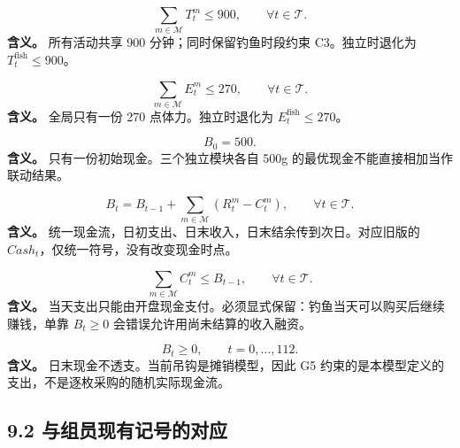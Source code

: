 \documentclass[11pt,a4paper]{article}
\begin{document}
\begin{samepage}
\[
\sum_{m\in\mathcal M}T_t^m\le900,\qquad\forall t\in\mathcal T. \tag{G1}
\]
\textbf{含义。} 所有活动共享 900 分钟；同时保留钓鱼时段约束 C3。独立时退化为 $T_t^{\mathrm{fish}}\le900$。\par
\end{samepage}

\begin{samepage}
\[
\sum_{m\in\mathcal M}E_t^m\le270,\qquad\forall t\in\mathcal T. \tag{G2}
\]
\textbf{含义。} 全局只有一份 270 点体力。独立时退化为 $E_t^{\mathrm{fish}}\le270$。\par
\end{samepage}

\begin{samepage}
\[
B_0=500. \tag{G3}
\]
\textbf{含义。} 只有一份初始现金。三个独立模块各自 500g 的最优现金不能直接相加当作联动结果。\par
\end{samepage}

\begin{samepage}
\[
B_t=B_{t-1}+\sum_{m\in\mathcal M}(R_t^m-C_t^m),
\qquad\forall t\in\mathcal T. \tag{G4}
\]
\textbf{含义。} 统一现金流，日初支出、日末收入，日末结余传到次日。对应旧版的 $Cash_t$，仅统一符号，没有改变现金时点。\par
\end{samepage}

\begin{samepage}
\[
\sum_{m\in\mathcal M}C_t^m\le B_{t-1},\qquad\forall t\in\mathcal T. \tag{G5}
\]
\textbf{含义。} 当天支出只能由开盘现金支付。必须显式保留：钓鱼当天可以购买后继续赚钱，单靠 $B_t\ge0$ 会错误允许用尚未结算的收入融资。\par
\end{samepage}

\begin{samepage}
\[
B_t\ge0,\qquad t=0,\ldots,112. \tag{G6}
\]
\textbf{含义。} 日末现金不透支。当前吊钩是摊销模型，因此 G5 约束的是本模型定义的支出，不是逐枚采购的随机实际现金流。\par
\end{samepage}

\subsection*{9.2 与组员现有记号的对应}
\end{document}
